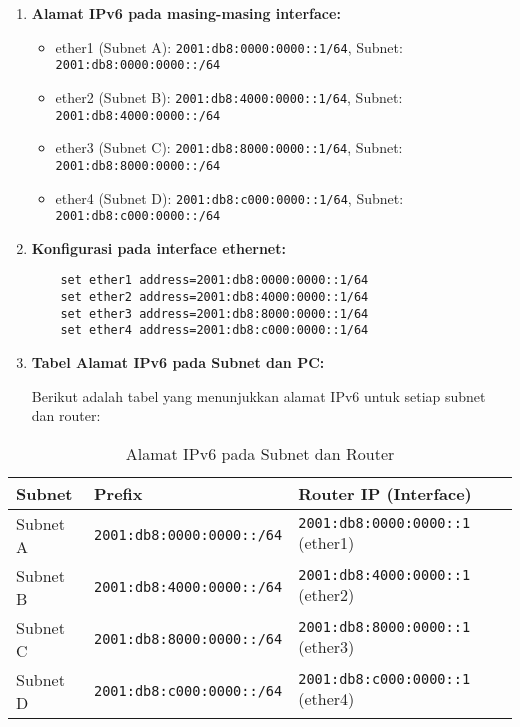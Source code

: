 \begin{enumerate}
    \item 
    \textbf{Alamat IPv6 pada masing-masing interface:}
    \begin{itemize}
        \item ether1 (Subnet A): \texttt{2001:db8:0000:0000::1/64}, Subnet: \texttt{2001:db8:0000:0000::/64}
        \item ether2 (Subnet B): \texttt{2001:db8:4000:0000::1/64}, Subnet: \texttt{2001:db8:4000:0000::/64}
        \item ether3 (Subnet C): \texttt{2001:db8:8000:0000::1/64}, Subnet: \texttt{2001:db8:8000:0000::/64}
        \item ether4 (Subnet D): \texttt{2001:db8:c000:0000::1/64}, Subnet: \texttt{2001:db8:c000:0000::/64}
    \end{itemize}

    \item 
    \textbf{Konfigurasi pada interface ethernet:}
    \begin{verbatim}
    set ether1 address=2001:db8:0000:0000::1/64
    set ether2 address=2001:db8:4000:0000::1/64
    set ether3 address=2001:db8:8000:0000::1/64
    set ether4 address=2001:db8:c000:0000::1/64
    \end{verbatim}

    \item \textbf{Tabel Alamat IPv6 pada Subnet dan PC:}
    
    Berikut adalah tabel yang menunjukkan alamat IPv6 untuk setiap subnet dan router:
\end{enumerate}

\begin{table}[h]
    \centering
    \caption{Alamat IPv6 pada Subnet dan Router}
    \begin{tabular}{|p{2cm}|p{5cm}|p{5cm}|}
        \hline
        \textbf{Subnet} & \textbf{Prefix} & \textbf{Router IP (Interface)} \\
        \hline
        Subnet A & \texttt{2001:db8:0000:0000::/64} & \texttt{2001:db8:0000:0000::1} (ether1) \\
        \hline
        Subnet B & \texttt{2001:db8:4000:0000::/64} & \texttt{2001:db8:4000:0000::1} (ether2) \\
        \hline
        Subnet C & \texttt{2001:db8:8000:0000::/64} & \texttt{2001:db8:8000:0000::1} (ether3) \\
        \hline
        Subnet D & \texttt{2001:db8:c000:0000::/64} & \texttt{2001:db8:c000:0000::1} (ether4) \\
        \hline
    \end{tabular}
\end{table}

